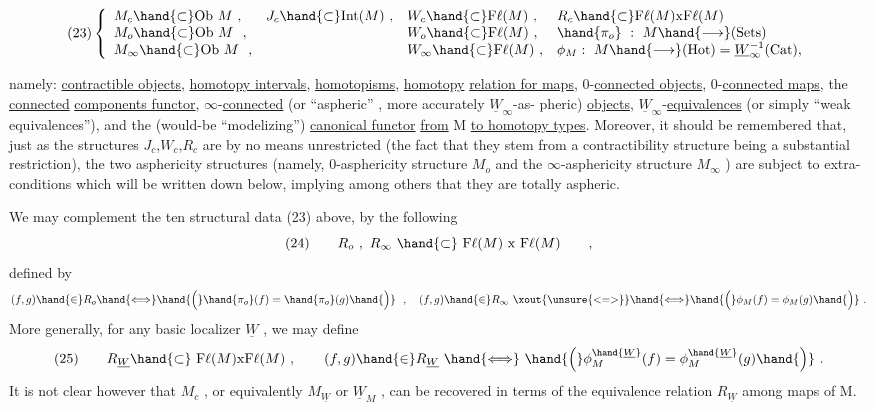 
\[
(23)\left\{\begin{array}{llll}
M_c\hand{\subset}\mathrm{Ob}\ M\ , & J_c\hand{\subset}\mathrm{Int}(M)\ , & W_c\hand{\subset}\mathrm{F\ell}(M)\ , & R_c\hand{\subset}\mathrm{F\ell}(M)\mathrm{x}\mathrm{F\ell}(M)\\
M_o\hand{\subset}\mathrm{Ob}\ M\ \ , & & W_o\hand{\subset}\mathrm{F\ell}(M)\ , & \hand{\pi_o}\ :\ M\hand{\longrightarrow}(\mathrm{Sets})\\
M_\infty\hand{\subset}\mathrm{Ob}\ M\ \ , & & W_\infty\hand{\subset}\mathrm{F\ell}(M)\ , & \phi_M:\ M\hand{\longrightarrow}(\mathrm{Hot})=\underline{W}_\infty^{-1}(\mathrm{Cat}),
\end{array}\right.
\]

namely: \uline{contractible objects}, \uline{homotopy intervals}, \uline{homotopisms}, \uline{homotopy}
\uline{relation for maps}, 0-\uline{connected objects}, 0-\uline{connected maps},\hand{(*)} the \uline{connected}
\uline{components functor}, $\infty$-\uline{connected} (or ``aspheric'' , more accurately $\underline{W}_\infty$-as-%
pheric) \uline{objects},  $\underline{W}_\infty$-\uline{equivalences} (or simply ``weak
equivalences''), and the (would-be ``modelizing'') \uline{canonical functor} \uline{from} M
\uline{to homotopy types}. Moreover, it should be remembered that, just as
the structures $J_c$,$W_c$,$R_c$ are by no means unrestricted (the fact that they
stem from a contractibility structure being a substantial restriction),
the two asphericity structures (namely,  0-asphericity structure $M_o$ and
the $\infty$-asphericity structure $M_\infty$ ) are  subject to extra-conditions which
will be written down below, implying  among others that they are
totally aspheric.

We may complement the ten structural data (23) above, by the following 
\[ (24) \qquad R_o\ ,\ R_\infty\ \hand{\subset}\ \mathrm{F\ell}(M)\ \mathrm{x}\ \mathrm{F\ell}(M) \qquad , \]
defined by
\[ (f,g)\hand{\in}R_o\hand{\Longleftrightarrow}\hand{\Big(}\hand{\pi_o}(f)=\hand{\pi_o}(g)\hand{\Big)}\ \ ,\quad (f,g)\hand{\in}R_\infty\ \xout{\unsure{<=>}}\hand{\Longleftrightarrow}\hand{\Big(}\phi_M(f)=\phi_M(g)\hand{\Big)}\ . \]
More generally, for any basic localizer $\underline{W}$ , we may define
\[ (25) \qquad R_{\underline{W}}\hand{\subset}\ \mathrm{F\ell}(M)\mathrm{x}\mathrm{F\ell}(M)\ ,\qquad (f,g)\hand{\in}R_{\underline{W}}\ \hand{\Longleftrightarrow}\ \hand{\Big(}\phi_M^{\hand{\underline{W}}}(f)=\phi_M^{\hand{\underline{W}}}(g)\hand{\Big)}\ . \]
It is not clear however that $M_c$ , or equivalently $M_{\underline{W}}$ or $\underline{W}_M$ , can be
recovered in terms of the equivalence relation $R_{\underline{W}}$ among maps of M.

